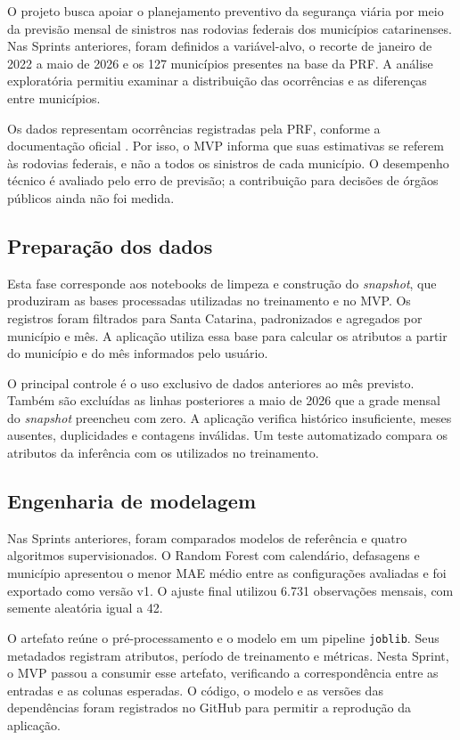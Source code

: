 \documentclass[12pt]{article}
\begin{document}
O projeto busca apoiar o planejamento preventivo da segurança viária por meio da previsão mensal de sinistros nas rodovias federais dos municípios catarinenses. Nas Sprints anteriores, foram definidos a variável-alvo, o recorte de janeiro de 2022 a maio de 2026 e os 127 municípios presentes na base da PRF. A análise exploratória permitiu examinar a distribuição das ocorrências e as diferenças entre municípios.

Os dados representam ocorrências registradas pela PRF, conforme a documentação oficial \cite{prf2026portal}. Por isso, o MVP informa que suas estimativas se referem às rodovias federais, e não a todos os sinistros de cada município. O desempenho técnico é avaliado pelo erro de previsão; a contribuição para decisões de órgãos públicos ainda não foi medida.

\subsection{Preparação dos dados}

Esta fase corresponde aos notebooks de limpeza e construção do \textit{snapshot}, que produziram as bases processadas utilizadas no treinamento e no MVP. Os registros foram filtrados para Santa Catarina, padronizados e agregados por município e mês. A aplicação utiliza essa base para calcular os atributos a partir do município e do mês informados pelo usuário.

O principal controle é o uso exclusivo de dados anteriores ao mês previsto. Também são excluídas as linhas posteriores a maio de 2026 que a grade mensal do \textit{snapshot} preencheu com zero. A aplicação verifica histórico insuficiente, meses ausentes, duplicidades e contagens inválidas. Um teste automatizado compara os atributos da inferência com os utilizados no treinamento.

\subsection{Engenharia de modelagem}

Nas Sprints anteriores, foram comparados modelos de referência e quatro algoritmos supervisionados. O Random Forest com calendário, defasagens e município apresentou o menor MAE médio entre as configurações avaliadas e foi exportado como versão v1. O ajuste final utilizou 6.731 observações mensais, com semente aleatória igual a 42.

O artefato reúne o pré-processamento e o modelo em um pipeline \texttt{joblib}. Seus metadados registram atributos, período de treinamento e métricas. Nesta Sprint, o MVP passou a consumir esse artefato, verificando a correspondência entre as entradas e as colunas esperadas. O código, o modelo e as versões das dependências foram registrados no GitHub para permitir a reprodução da aplicação.
\end{document}
